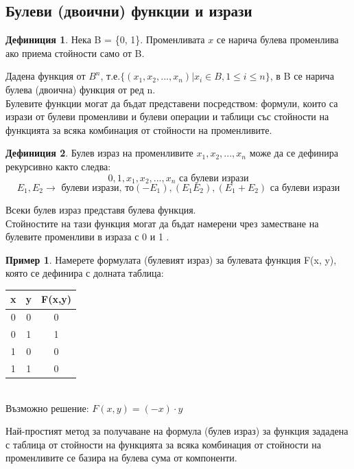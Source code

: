 \documentclass[fleqn, 12pt]{article}
\theoremstyle{definition}
\newtheorem{example}{Пример}[subsection]
\newtheorem{definition}{Дефиниция}[subsection]
\begin{document}
\subsection{Булеви (двоични) функции и изрази}
\begin{definition}
Нека B = \{0, 1\}. Променливата $x$ се нарича булева променлива ако приема стойности само от B.
\end{definition}
Дадена функция от $B^n$, т.е.$\{(x_1, x_2, ..., x_n) \vert x_i \in B, 1 \leq i \leq n\}$, в B се нарича булева (двоична) функция от ред n.\\
Булевите функции могат да бъдат представени посредством: формули, които са изрази от булеви променливи и булеви операции и таблици със стойности на функцията за всяка комбинация от стойности на променливите.
\begin{definition}
Булев израз на променливите $x_1, x_2, ..., x_n$ може да се дефинира рекурсивно както следва:
$$0,1,x_1, x_2,..., x_n \text{ са булеви изрази}$$
$$E_1, E_2 \to \text{ булеви изрази, то} (-E_1), (E_1E_2), (E_1+E_2)  \text{ са булеви изрази}$$
\end{definition}
Всеки булев израз представя булева функция. \\
Стойностите на тази функция могат да бъдат намерени чрез заместване на булевите променливи в израза с 0 и 1 .
\begin{example}
Намерете формулата (булевият израз) за булевата функция F(x, y), която се дефинира с долната таблица:
\begin{table}[h!]
  \begin{center}
    \begin{tabular}{|c|c|c|} 
\hline
      \textbf{x} &  \textbf{y} &  \textbf{F(x,y)}\\
\hline
	0 & 0 & 0\\ 
\hline
	0 & 1 & 1\\
\hline
	1& 0 & 0\\
\hline
 	1 &1 & 0 \\  
\hline
    \end{tabular}
  \end{center}
\end{table}
\\
Възможно решение: $F(x,y) = (-x) \cdot y$
\end{example}
Най-простият метод за получаване на формула (булев израз) за функция зададена с таблица от стойности на функцията за всяка комбинация от стойности на променливите се базира на булева сума от компоненти.\\
\end{document}
